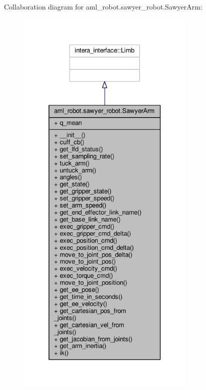 Collaboration diagram for aml\-\_\-robot.\-sawyer\-\_\-robot.\-Sawyer\-Arm\-:\nopagebreak
\begin{figure}[H]
\begin{center}
\leavevmode
\includegraphics[height=550pt]{classaml__robot_1_1sawyer__robot_1_1_sawyer_arm__coll__graph}
\end{center}
\end{figure}
